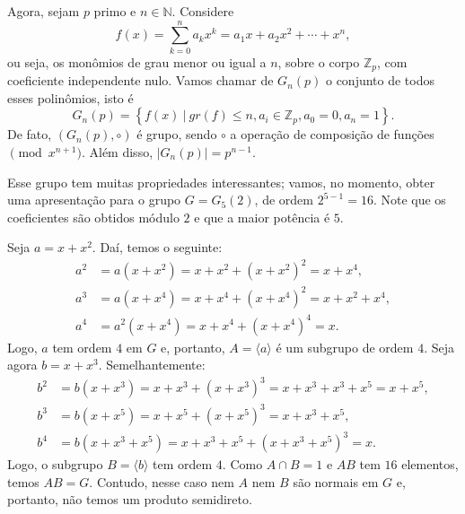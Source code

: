     	\par\vspace{0.3cm} Agora, sejam $p$ primo e $n\in\mathbb{N}$. Considere
    	\begin{equation*}
    	    f(x) = \sum_{k=0}^{n}a_kx^k = a_1x + a_2x^2 + \cdots + x^n, 
    	\end{equation*}
    	ou seja, os monômios de grau menor ou igual a $n$, sobre o corpo $\mathbb{Z}_p$, 
    	com coeficiente independente nulo. Vamos chamar de $G_n(p)$ o conjunto de todos esses polinômios, 
    	isto é
    	\begin{equation*}
    	    G_n(p) = \left\{ f(x) \ | \ gr(f)\leq n, a_i\in\mathbb{Z}_p, a_0=0,a_n=1 \right\}.
    	\end{equation*}
    	De fato, $( G_n(p), \circ )$ é grupo, sendo $\circ$ a operação de composição 
    	de funções $\pmod {x^{n+1}}$. Além disso, $|G_n(p)| = p^{n-1}$.
    	
    	\par\vspace{0.3cm} Esse grupo tem muitas propriedades interessantes; vamos, no momento, 
    	obter uma apresentação para o grupo $G = G_5(2)$, de ordem $2^{5-1} = 16$. Note que os coeficientes 
    	são obtidos módulo $2$ e que a maior potência é $5$.
    	
    	\par\vspace{0.3cm} Seja $a = x+x^2$. Daí, temos o seguinte:
    	\begin{align*}
        	a^2 &= a(x+x^2) = x+x^2+(x+x^2)^2 = x+x^4, \\
        	a^3 &= a(x+x^4) = x+x^4+(x+x^4)^2 = x+x^2+x^4, \\
        	a^4 &= a^2(x+x^4) = x+x^4+(x+x^4)^4 = x.
    	\end{align*}
    	Logo, $a$ tem ordem $4$ em $G$ e, portanto, $A = \langle a \rangle$ é um 
    	subgrupo de ordem $4$. Seja agora $b = x+x^3$. Semelhantemente:
    	\begin{align*}
        	b^2 &= b(x+x^3) = x+x^3 + (x+x^3)^3 = x+x^3+x^3+x^5 = x+x^5, \\
        	b^3 &= b(x+x^5) = x+x^5+(x+x^5)^3 = x+x^3+x^5, \\
        	b^4 &= b(x+x^3+x^5) = x+x^3+x^5+(x+x^3+x^5)^3 = x.
    	\end{align*}
    	Logo, o subgrupo $B = \langle b \rangle$ tem ordem $4$. Como $A\cap B = 1$ e 
    	$AB$ tem $16$ elementos, temos $AB=G$. Contudo, nesse caso nem $A$ nem $B$ são normais em $G$ e, 
    	portanto, não temos um produto semidireto. 
    	
